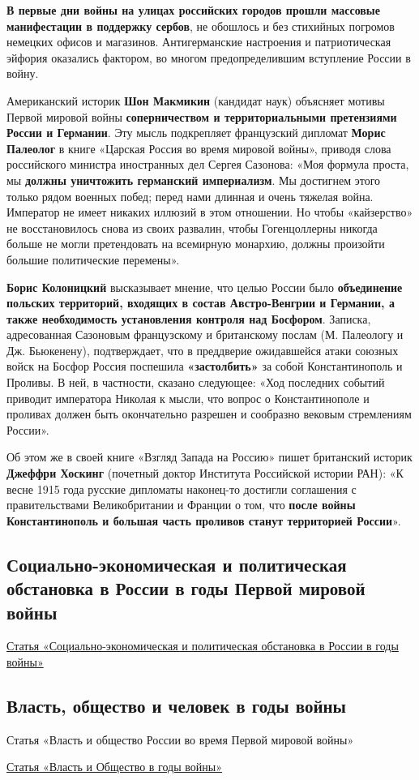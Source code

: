 \documentclass{article}
\begin{document}
\textbf{В первые дни войны на улицах российских городов прошли массовые манифестации в поддержку сербов}, не обошлось и без стихийных погромов немецких офисов и магазинов. Антигерманские настроения и патриотическая эйфория оказались фактором, во многом предопределившим вступление России в войну.

\hfill

Американский историк \textbf{Шон Макмикин} (кандидат наук) объясняет мотивы Первой мировой войны \textbf{соперничеством и территориальными претензиями России и Германии}. Эту мысль подкрепляет французский дипломат \textbf{Морис Палеолог} в книге «Царская Россия во время мировой войны», приводя слова российского министра иностранных дел Сергея Сазонова: «Моя формула проста, мы \textbf{должны уничтожить германский империализм}. Мы достигнем этого только рядом военных побед; перед нами длинная и очень тяжелая война. Император не имеет никаких иллюзий в этом отношении. Но чтобы «кайзерство» не восстановилось снова из своих развалин, чтобы Гогенцоллерны никогда больше не могли претендовать на всемирную монархию, должны произойти большие политические перемены».

\textbf{Борис Колоницкий} высказывает мнение, что целью России было \textbf{объединение польских территорий, входящих в состав Австро-Венгрии и Германии, а также необходимость установления контроля над Босфором}. Записка, адресованная Сазоновым французскому и британскому послам (М. Палеологу и Дж. Бьюкенену), подтверждает, что в преддверие ожидавшейся атаки союзных войск на Босфор Россия поспешила \textbf{«застолбить»} за собой Константинополь и Проливы. В ней, в частности, сказано следующее: «Ход последних событий приводит императора Николая к мысли, что вопрос о Константинополе и проливах должен быть окончательно разрешен и сообразно вековым стремлениям России».

Об этом же в своей книге «Взгляд Запада на Россию» пишет британский историк \textbf{Джеффри Хоскинг} (почетный доктор Института Российской истории РАН): «К весне 1915 года русские дипломаты наконец-то достигли соглашения с правительствами Великобритании и Франции о том, что \textbf{после войны Константинополь и большая часть проливов станут территорией России}».

\pagebreak
\subsection{Социально-экономическая и политическая обстановка в России в годы Первой мировой войны}

\href{https://studme.org/1911052216224/istoriya/sotsialno-ekonomicheskaya_politicheskaya_obstanovka_rossii_gody_voyny}{Статья «Социально-экономическая и политическая обстановка в России в годы войны»}

\pagebreak
\subsection{Власть, общество и человек в годы войны}{Статья «Власть и общество России во время Первой мировой войны»}

\href{https://histerl.ru/kurs_sssp/podrobno/vlasti_obshestvo_v_godi_voini.htm}{Статья «Власть и Общество в годы войны»}
\end{document}
